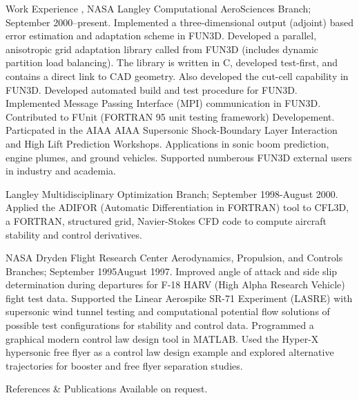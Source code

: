 \documentclass{resume}
\begin{document}
\begin{category}{Work Experience}
, NASA Langley Computational AeroSciences Branch;
September 2000--present.
Implemented a three-dimensional output (adjoint) based error
estimation and adaptation scheme in FUN3D. 
Developed a parallel, anisotropic grid adaptation
library called from FUN3D (includes dynamic partition load balancing).
The library is
written in C, developed test-first, and contains a direct link to CAD geometry.
Also developed the cut-cell capability in FUN3D.
Developed automated build and test procedure for FUN3D.
Implemented Message Passing Interface (MPI) communication in FUN3D.
Contributed to FUnit (FORTRAN 95 unit testing framework) Developement.
Particpated in the AIAA AIAA Supersonic Shock-Boundary Layer Interaction and High Lift Prediction Workshops.
Applications in sonic boom prediction, engine plumes, and ground vehicles.
Supported numberous FUN3D external users in industry and academia.

  Langley Multidisciplinary Optimization Branch;
 September 1998­-August 2000.
Applied the ADIFOR (Automatic Differentiation in FORTRAN) tool to
CFL3D, a FORTRAN, structured grid, Navier-Stokes CFD code to compute
aircraft stability and control derivatives.

NASA Dryden Flight Research Center Aerodynamics, Propulsion, and Controls
Branches; September 1995­August 1997. 
Improved angle of attack and
side slip determination during departures for F-18 HARV (High Alpha
Research Vehicle) fight test data. Supported the Linear Aerospike
SR-71 Experiment (LASRE) with supersonic wind tunnel testing and
computational potential flow solutions of possible test configurations
for stability and control data. Programmed a graphical modern control
law design tool in MATLAB. Used the Hyper-X hypersonic free flyer as a
control law design example and explored alternative trajectories for
booster and free flyer separation studies.


\end{category}


\begin{category}{References \& Publications} 
\citemnobullet Available on request.
\end{category}
\end{document}
